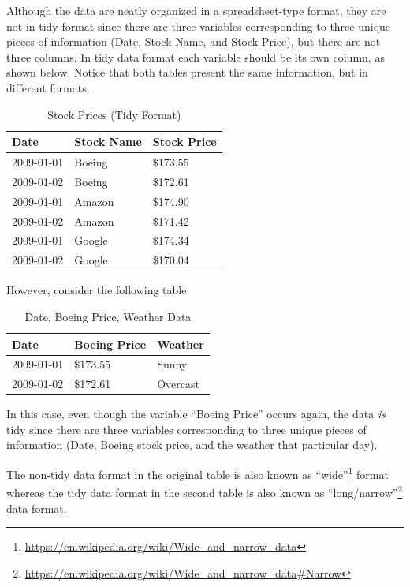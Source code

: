 \documentclass[12pt,]{krantz}
\renewcommand{\href}[2]{#2\footnote{\url{#1}}}
\theoremstyle{definition}
\theoremstyle{definition}
\theoremstyle{definition}
\theoremstyle{remark}
\begin{document}
Although the data are neatly organized in a spreadsheet-type format,
they are not in tidy format since there are three variables
corresponding to three unique pieces of information (Date, Stock Name,
and Stock Price), but there are not three columns. In tidy data format
each variable should be its own column, as shown below. Notice that both
tables present the same information, but in different formats.

\begin{table}[H]

\caption{\label{tab:unnamed-chunk-62}Stock Prices (Tidy Format)}
\centering
\fontsize{10}{12}\selectfont
\begin{tabular}[t]{lll}
\toprule
Date & Stock Name & Stock Price\\
\midrule
2009-01-01 & Boeing & \$173.55\\
2009-01-02 & Boeing & \$172.61\\
2009-01-01 & Amazon & \$174.90\\
2009-01-02 & Amazon & \$171.42\\
2009-01-01 & Google & \$174.34\\
2009-01-02 & Google & \$170.04\\
\bottomrule
\end{tabular}
\end{table}

However, consider the following table

\begin{table}[H]

\caption{\label{tab:unnamed-chunk-63}Date, Boeing Price, Weather Data}
\centering
\fontsize{10}{12}\selectfont
\begin{tabular}[t]{lll}
\toprule
Date & Boeing Price & Weather\\
\midrule
2009-01-01 & \$173.55 & Sunny\\
2009-01-02 & \$172.61 & Overcast\\
\bottomrule
\end{tabular}
\end{table}

In this case, even though the variable ``Boeing Price'' occurs again,
the data \emph{is} tidy since there are three variables corresponding to
three unique pieces of information (Date, Boeing stock price, and the
weather that particular day).

The non-tidy data format in the original table is also known as
\href{https://en.wikipedia.org/wiki/Wide_and_narrow_data}{``wide''}
format whereas the tidy data format in the second table is also known as
\href{https://en.wikipedia.org/wiki/Wide_and_narrow_data\#Narrow}{``long/narrow''}
data format.
\end{document}
